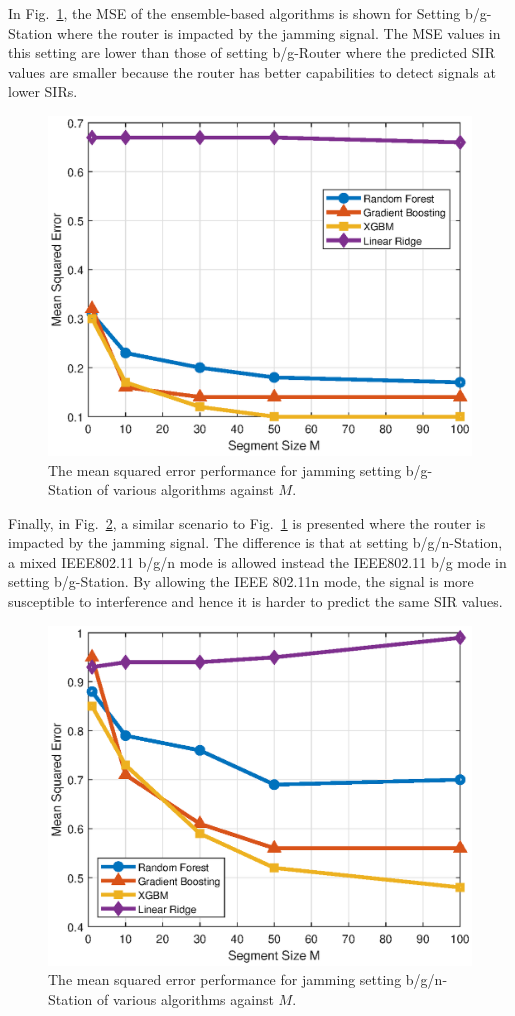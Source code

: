 In Fig.~\ref{ftml-jrnl:fig:002_MSE_M}, the MSE of the ensemble-based algorithms is shown for Setting b/g-Station where the router is impacted by the jamming signal. The MSE values in this setting are lower than those of setting b/g-Router where the predicted SIR values are smaller because the router has better capabilities to detect signals at lower SIRs.    
\begin{figure}[!ht]
	\centering
	\includegraphics[width=0.75\columnwidth]{./chapter-ftml/plots/002_MSE_M.eps}
	\caption{The mean squared error performance for jamming setting b/g-Station of various algorithms against $M$.}
	\label{ftml-jrnl:fig:002_MSE_M}      
\end{figure}

Finally, in Fig.~\ref{ftml-jrnl:fig:004_MSE_M}, a similar scenario to Fig.~\ref{ftml-jrnl:fig:002_MSE_M} is presented where the router is impacted by the jamming signal. The difference is that at setting b/g/n-Station, a mixed IEEE802.11 b/g/n mode is allowed instead the IEEE802.11 b/g mode in setting b/g-Station. By allowing the IEEE 802.11n mode, the signal is more susceptible to interference and hence it is harder to predict the same SIR values. 

\begin{figure}[!ht]
	\centering
	\includegraphics[width=0.75\columnwidth]{./chapter-ftml/plots/004_MSE_M.eps}
	\caption{The mean squared error performance for jamming setting b/g/n-Station of various algorithms against $M$.}
	\label{ftml-jrnl:fig:004_MSE_M}      
\end{figure}

